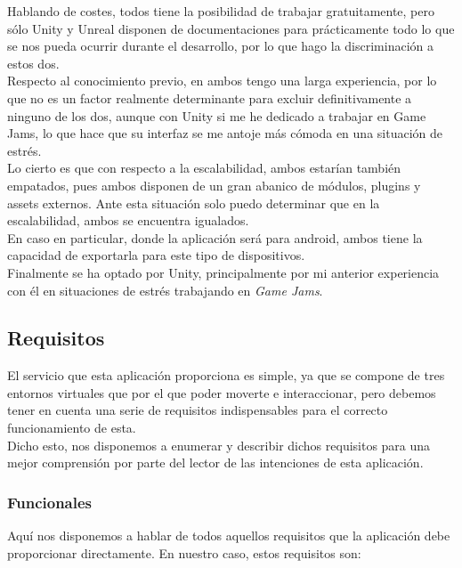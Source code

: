 \quad Hablando de costes, todos tiene la posibilidad de trabajar gratuitamente, pero sólo Unity y Unreal disponen de documentaciones para prácticamente todo lo que se nos pueda ocurrir durante el desarrollo, por lo que hago la discriminación a estos dos.\\ 

\quad Respecto al conocimiento previo, en ambos tengo una larga experiencia, por lo que no es un  factor realmente determinante para excluir definitivamente a ninguno de los dos, aunque con Unity si me he dedicado a trabajar en Game Jams, lo que hace que su interfaz se me antoje más cómoda en una situación de estrés.\\

\quad Lo cierto es que con respecto a la escalabilidad, ambos estarían también empatados, pues ambos disponen de un gran abanico de módulos, plugins y assets externos. Ante esta situación solo puedo determinar que en la escalabilidad, ambos se encuentra igualados.\\

\quad En caso en particular, donde la aplicación será para android, ambos tiene la capacidad de exportarla para este tipo de dispositivos.\\

\quad Finalmente se ha optado por Unity, principalmente por mi anterior experiencia con él en situaciones de estrés trabajando en \textit{Game Jams}.

\subsection{Requisitos}

\quad El servicio que esta aplicación proporciona es simple, ya que se compone de tres entornos virtuales que por el que poder moverte e interaccionar, pero debemos tener en cuenta una serie de requisitos indispensables para el correcto funcionamiento de esta.\\

\quad Dicho esto, nos disponemos a enumerar y describir dichos requisitos para una mejor comprensión por parte del lector de las intenciones de esta aplicación.\\

\subsubsection{Funcionales}

\quad Aquí nos disponemos a hablar de todos aquellos requisitos que la aplicación debe proporcionar directamente. En nuestro caso, estos requisitos son:

